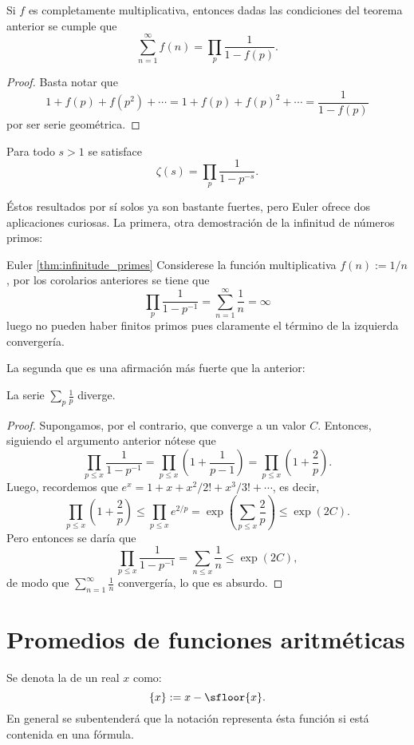 \documentclass[teoria-numeros.tex]{subfiles}
\begin{document}
\begin{cor}
	Si $f$ es completamente multiplicativa, entonces dadas las condiciones del teorema anterior se cumple que
	$$ \sum_{n=1}^\infty f(n) = \prod_p \frac{1}{1 - f(p)}. $$
\end{cor}
\begin{proof}
	Basta notar que
	$$ 1 + f(p) + f(p^2) + \cdots = 1 + f(p) + f(p)^2 + \cdots = \frac{1}{1 - f(p)} $$
	por ser serie geométrica.
\end{proof}

\begin{cor}
	Para todo $s > 1$ se satisface
	$$ \zeta(s) = \prod_p \frac{1}{1 - p^{-s}}. $$
\end{cor}

Éstos resultados por sí solos ya son bastante fuertes, pero Euler ofrece dos aplicaciones curiosas.
La primera, otra demostración de la infinitud de números primos:
\begin{Proof}{{Euler \ref{thm:infinitude_primes}}}
	Considerese la función multiplicativa $f(n) := 1/n$, por los corolarios anteriores se tiene que
	$$ \prod_p \frac{1}{1 - p^{-1}} = \sum_{n=1}^\infty \frac{1}{n} = \infty $$
	luego no pueden haber finitos primos pues claramente el término de la izquierda convergería.
\end{Proof}

La segunda que es una afirmación más fuerte que la anterior:
\begin{thm}
	La serie $\sum_p \frac{1}{p}$ diverge.
\end{thm}
\begin{proof}
	Supongamos, por el contrario, que converge a un valor $C$.
	Entonces, siguiendo el argumento anterior nótese que
	$$ \prod_{p\le x} \frac{1}{1 - p^{-1}} = \prod_{p\le x} \left( 1 + \frac{1}{p - 1} \right) = \prod_{p\le x} \left( 1 + \frac{2}{p} \right). $$
	Luego, recordemos que $e^x = 1 + x + x^2/2! + x^3/3! + \cdots$, es decir,
	$$ \prod_{p\le x} \left( 1 + \frac{2}{p} \right) \le \prod_{p\le x} e^{2/p} = \exp\left( \sum_{p\le x} \frac{2}{p} \right) \le \exp(2C). $$
	Pero entonces se daría que
	$$ \prod_{p\le x} \frac{1}{1 - p^{-1}} = \sum_{n \le x} \frac{1}{n} \le \exp(2C), $$
	de modo que $\sum_{n=1}^\infty \frac{1}{n}$ convergería, lo que es absurdo.
\end{proof}

\section{Promedios de funciones aritméticas}
\begin{mydef}
	Se denota la  de un real $x$ como:
	$$ \{x\} := x - \sfloor{x}. $$
	En general se subentenderá que la notación representa ésta función si está contenida en una fórmula.
\end{mydef}
\end{document}
